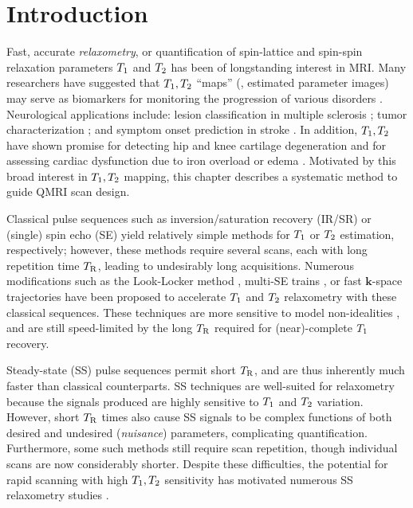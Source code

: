
\section{Introduction}
\label{s,scn-dsgn,intro}

Fast, accurate \emph{relaxometry}, 
or quantification
of spin-lattice and spin-spin relaxation parameters $T_1$ and $T_2$ 
has been of longstanding interest in MRI. 
Many researchers have suggested 
that $T_1, T_2$ ``maps''
(\ie, estimated parameter images)
may serve as biomarkers 
for monitoring the progression 
of various disorders \cite{cheng:12:pma}. 
Neurological applications include: 
lesion classification in multiple sclerosis 
\cite{larsson:88:ivd}; 
tumor characterization 
\cite{kurki:96:tco, englund:86:rti}; 
and symptom onset prediction in stroke 
\cite{siemonsen:09:qtv, dewitt:87:nnc}. 
In addition, 
$T_1, T_2$ have shown promise 
for detecting hip and knee cartilage degeneration 
\cite{matzat:13:qmt, mosher:04:cmt} 
and for assessing cardiac dysfunction 
due to iron overload \cite{guo:09:mtq} 
or edema \cite{giri:09:tqf}. 
Motivated by this broad interest 
in $T_1, T_2$ mapping, 
this chapter describes a systematic method 
to guide QMRI scan design.

Classical pulse sequences 
such as inversion/saturation recovery (IR/SR) 
or (single) spin echo (SE) 
yield relatively simple methods 
for $T_1$ or $T_2$ estimation, respectively; 
however, these methods require several scans, 
each with long repetition time $T_\mathrm{R}$, 
leading to undesirably long acquisitions. 
Numerous modifications 
such as the Look-Locker method \cite{look:70:tsi}, 
multi-SE trains \cite{carr:54:eod}, 
or fast $\mathbf{k}$-space trajectories 
\cite{stehling:91:epi, ahn:86:hss, meyer:92:fsc} 
have been proposed to accelerate $T_1$ 
\cite{kay:91:pia, gowland:92:faa, messroghli:04:mll, stehling:90:ire} 
and $T_2$ 
\cite{bonny:96:tml, kumar:12:bau, beneliezer:15:raa, nguyen:12:ttd} 
relaxometry 
with these classical sequences.
These techniques are more sensitive 
to model non-idealities 
\cite{majumdar:86:eit-1, majumdar:86:eit-2, farzaneh:90:aot}, 
and are still speed-limited 
by the long $T_\mathrm{R}$ required 
for (near)-complete $T_1$ recovery.

Steady-state (SS) pulse sequences 
\cite{hinshaw:76:ifb, scheffler:99:apd} 
permit short $T_\mathrm{R}$, 
and are thus inherently much faster 
than classical counterparts.
SS techniques are well-suited for relaxometry 
because the signals produced are highly sensitive 
to $T_1$ and $T_2$ variation. 
However, short $T_\mathrm{R}$ times also cause SS signals 
to be complex functions 
of both desired and undesired (\emph{nuisance}) parameters, 
complicating quantification. 
Furthermore, some such methods 
\cite{deoni:03:rct, chang:08:lls} 
still require scan repetition, 
though individual scans are now considerably shorter. 
Despite these difficulties, 
the potential for rapid scanning 
with high $T_1, T_2$ sensitivity 
has motivated numerous SS relaxometry studies 
\cite{fram:87:rco, deoni:03:rct, chang:08:lls, wang:12:srt, deoni:04:rte, deoni:09:trt, welsch:09:reo, heule:14:reo, stocker:14:mpq, heule:14:tes-mrm}.

